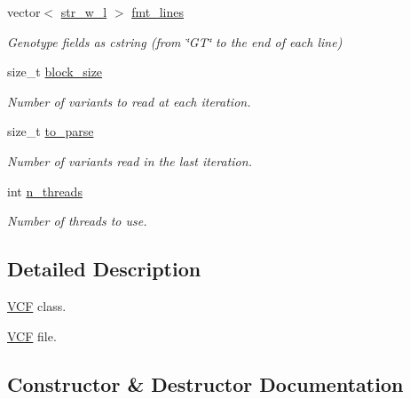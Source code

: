 \begin{DoxyCompactItemize}
\mbox{\label{classVCF_a7b54de8bf275a2c076bc85997097664d}} 
vector$<$ \mbox{\hyperlink{structstr__w__l}{str\+\_\+w\+\_\+l}} $>$ \mbox{\hyperlink{classVCF_a7b54de8bf275a2c076bc85997097664d}{fmt\+\_\+lines}}
\begin{DoxyCompactList}\small\item\em Genotype fields as cstring (from \char`\"{}\+G\+T\char`\"{} to the end of each line) \end{DoxyCompactList}\item 
\mbox{\label{classVCF_ab02c6a640c94c2b8705c1ba624a7c5fa}} 
size\+\_\+t \mbox{\hyperlink{classVCF_ab02c6a640c94c2b8705c1ba624a7c5fa}{block\+\_\+size}}
\begin{DoxyCompactList}\small\item\em Number of variants to read at each iteration. \end{DoxyCompactList}\item 
\mbox{\label{classVCF_a0ec2fd6f15706955d0e7128c00c93be7}} 
size\+\_\+t \mbox{\hyperlink{classVCF_a0ec2fd6f15706955d0e7128c00c93be7}{to\+\_\+parse}}
\begin{DoxyCompactList}\small\item\em Number of variants read in the last iteration. \end{DoxyCompactList}\item 
\mbox{\label{classVCF_ae5666687fe43fb9a6834fb2a2a0304d6}} 
int \mbox{\hyperlink{classVCF_ae5666687fe43fb9a6834fb2a2a0304d6}{n\+\_\+threads}}
\begin{DoxyCompactList}\small\item\em Number of threads to use. \end{DoxyCompactList}\end{DoxyCompactItemize}


\subsection{Detailed Description}
\mbox{\hyperlink{classVCF}{V\+CF}} class. 

\mbox{\hyperlink{classVCF}{V\+CF}} file. 

\subsection{Constructor \& Destructor Documentation}
\mbox{\label{classVCF_a7f3175ad616eff67664a23784442401e}} 
